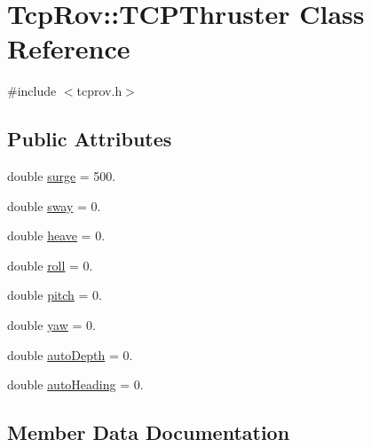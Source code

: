 \hypertarget{class_tcp_rov_1_1_t_c_p_thruster}{}\section{Tcp\+Rov\+:\+:T\+C\+P\+Thruster Class Reference}
\label{class_tcp_rov_1_1_t_c_p_thruster}


{\ttfamily \#include $<$tcprov.\+h$>$}

\subsection*{Public Attributes}
\begin{DoxyCompactItemize}
\item 
double \mbox{\hyperlink{class_tcp_rov_1_1_t_c_p_thruster_a474c320098f1c3fc74176ca970a4b024}{surge}} = 500.
\item 
double \mbox{\hyperlink{class_tcp_rov_1_1_t_c_p_thruster_a613e71622f31cb54df9cfbd93dab81de}{sway}} = 0.
\item 
double \mbox{\hyperlink{class_tcp_rov_1_1_t_c_p_thruster_a7dc1c94af238daa684ee2f3eceb17af3}{heave}} = 0.
\item 
double \mbox{\hyperlink{class_tcp_rov_1_1_t_c_p_thruster_ac9f231a15b217525bdfb80322886ca8f}{roll}} = 0.
\item 
double \mbox{\hyperlink{class_tcp_rov_1_1_t_c_p_thruster_a3c61e041aaa16fd544cdae6ac0f90713}{pitch}} = 0.
\item 
double \mbox{\hyperlink{class_tcp_rov_1_1_t_c_p_thruster_ab79c738388b76b8e79b153ca3691cfda}{yaw}} = 0.
\item 
double \mbox{\hyperlink{class_tcp_rov_1_1_t_c_p_thruster_aac3fa075f9b125e8398474a15480f987}{auto\+Depth}} = 0.
\item 
double \mbox{\hyperlink{class_tcp_rov_1_1_t_c_p_thruster_ae243c7687392a5b26e8173a4d83d9ba1}{auto\+Heading}} = 0.
\end{DoxyCompactItemize}


\subsection{Member Data Documentation}
\mbox{\label{class_tcp_rov_1_1_t_c_p_thruster_aac3fa075f9b125e8398474a15480f987}} 
